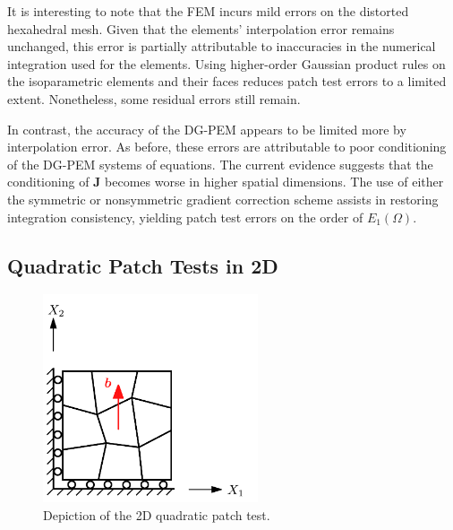 It is interesting to note that the FEM incurs mild errors on the distorted hexahedral mesh. Given that the elements' interpolation error remains unchanged, this error is partially attributable to inaccuracies in the numerical integration used for the elements. Using higher-order Gaussian product rules on the isoparametric elements and their faces reduces patch test errors to a limited extent. Nonetheless, some residual errors still remain.

In contrast, the accuracy of the DG-PEM appears to be limited more by interpolation error. As before, these errors are attributable to poor conditioning of the DG-PEM systems of equations. The current evidence suggests that the conditioning of $\bm{J}$ becomes worse in higher spatial dimensions. The use of either the symmetric or nonsymmetric gradient correction scheme assists in restoring integration consistency, yielding patch test errors on the order of $E_1 (\Omega)$.

\subsection*{Quadratic Patch Tests in 2D}

\begin{figure}[!h]
    \centering
    \includegraphics[width=2.5in]{figures/quadratic_patch_test.pdf}
    	\caption{Depiction of the 2D quadratic patch test.}
    \label{fig:quadratic_patch_test}
\end{figure}

